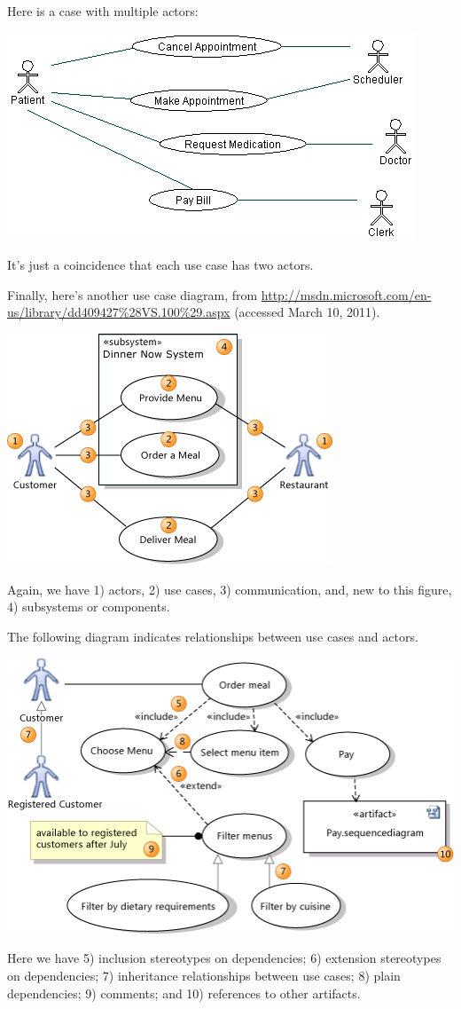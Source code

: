 Here is a case with multiple actors:

\begin{center}
\includegraphics[width=.45\textwidth]{images/usecase-multiple.png}
\end{center}
It's just a coincidence that each use case has two actors.

Finally, here's another use case diagram,
from \url{http://msdn.microsoft.com/en-us/library/dd409427%28VS.100%29.aspx}
(accessed March 10, 2011).

\begin{center}
\includegraphics[width=.3\textwidth]{images/dinnernow.png}
\end{center}

Again, we have 1) actors, 2) use cases, 3) communication, and, new to this
figure, 4) subsystems or components. 


The following diagram indicates
relationships between use cases and actors.

\begin{center}
\includegraphics[width=.55\textwidth]{images/dinnernow2.png}
\end{center}

Here we have 5) inclusion stereotypes on dependencies; 6) extension
stereotypes on dependencies; 7) inheritance relationships between use cases;
8) plain dependencies; 9) comments; and 10) references to other artifacts.

